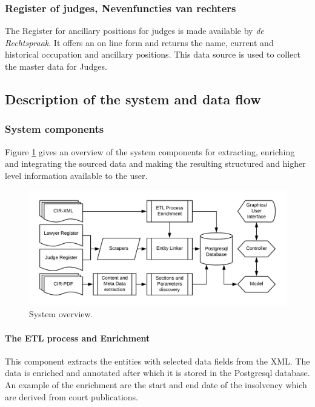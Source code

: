 \subsubsection{Register of judges, Nevenfuncties van rechters}\label{Nevenfuncties Rechters}

The Register for ancillary positions for judges is made available by \textit{de Rechtspraak}\cite{rechtspraak:2}. It offers an on line form and returns the name, current and historical occupation and ancillary positions. This data source is used to collect the master data for Judges.


\subsection{Description of the system and data flow}
\subsubsection{System components}
Figure \ref{System overview} gives an overview of the system components for extracting, enriching and integrating the sourced data and making the resulting structured and higher level information available to the user.

\begin{figure}[h]
\includegraphics[width=1\linewidth]{system_overview.png}
\caption{System overview.}\label{System overview}
\end{figure}

\paragraph{The ETL process and Enrichment} This component extracts the entities with selected data fields from the XML. The data is enriched and annotated after which it is stored in the Postgresql database. An example of the enrichment are the start and end date of the insolvency which are derived from court publications.

